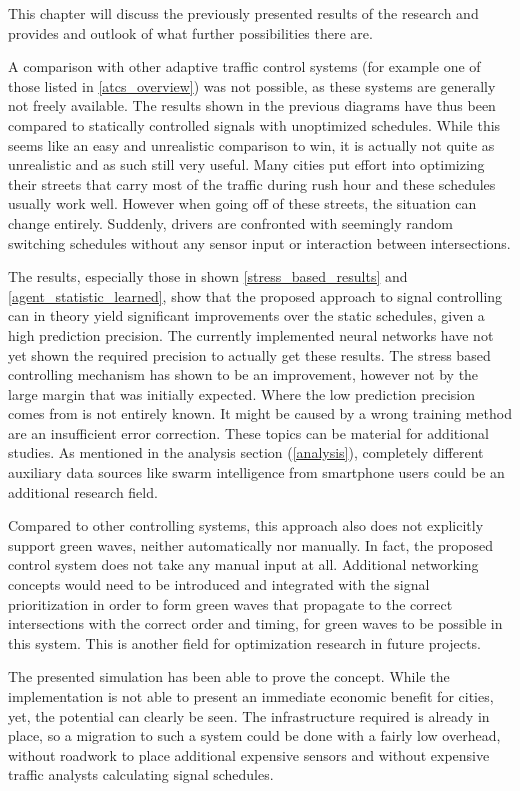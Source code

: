 This chapter will discuss the previously presented results of the research and provides and outlook of what further possibilities there are.

A comparison with other adaptive traffic control systems (for example one of those listed in \autoref{atcs_overview}) was not possible, as these systems are generally not freely available. The results shown in the previous diagrams have thus been compared to statically controlled signals with unoptimized schedules. While this seems like an easy and unrealistic comparison to win, it is actually not quite as unrealistic and as such still very useful. Many cities put effort into optimizing their streets  that carry most of the traffic during rush hour and these schedules usually work well. However when going off of these streets, the situation can change entirely. Suddenly, drivers are confronted with seemingly random switching schedules without any sensor input or interaction between intersections.

The results, especially those in shown \autoref{stress_based_results} and \autoref{agent_statistic_learned}, show that the proposed approach to signal controlling can in theory yield significant improvements over the static schedules, given a high prediction precision. The currently implemented neural networks have not yet shown the required precision to actually get these results. The stress based controlling mechanism has shown to be an improvement, however not by the large margin that was initially expected. Where the low prediction precision comes from is not entirely known. It might be caused by a wrong training method are an insufficient error correction. These topics can be material for additional studies. As mentioned in the analysis section (\autoref{analysis}), completely different auxiliary data sources like swarm intelligence from smartphone users could be an additional research field.

Compared to other controlling systems, this approach also does not explicitly support green waves, neither automatically nor manually. In fact, the proposed control system does not take any manual input at all. Additional networking concepts would need to be introduced and integrated with the signal prioritization in order to form green waves that propagate to the correct intersections with the correct order and timing, for green waves to be possible in this system. This is another field for optimization research in future projects.

The presented simulation has been able to prove the concept. While the implementation is not able to present an immediate economic benefit for cities, yet, the potential can clearly be seen. The infrastructure required is already in place, so a migration to such a system could be done with a fairly low overhead, without roadwork to place additional expensive sensors and without expensive traffic analysts calculating signal schedules.

